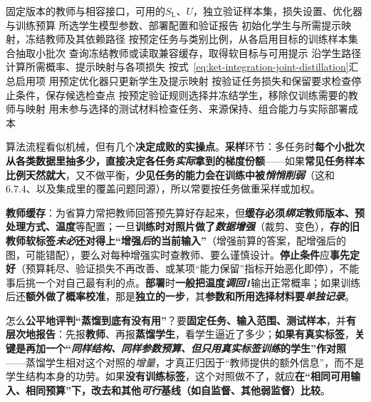 \begin{algorithm}[从冻结教师到可部署学生]
  \label{alg:ket-integration-distillation-loop}
  \begin{algorithmic}[1]
    \Require 固定版本的教师与相容接口，可用的$S_{\mathrm{L}}$、$U$，独立验证样本集，损失设置、优化器与训练预算
    \Ensure 所选学生模型参数、部署配置和验证报告
    \State 初始化学生与所需提示映射，冻结教师及其依赖路径
      \State 按预定任务与类别比例，从各启用目标的训练样本集合抽取小批次
      \State 查询冻结教师或读取兼容缓存，取得软目标与可用提示
      \State 沿学生路径计算所需概率、提示映射与各项损失
      \State 按式~\eqref{eq:ket-integration-joint-distillation}汇总启用项
      \State 用预定优化器只更新学生及提示映射
      \State 按验证任务损失和保留要求检查停止条件，保存候选检查点
    \EndFor
    \State 按预定验证规则选择并冻结学生，移除仅训练需要的教师与映射
    \State 用未参与选择的测试材料检查任务、来源保持、组合能力与实际部署成本
  \end{algorithmic}
\end{algorithm}

算法流程看似机械，但有几个\textbf{决定成败的实操点}。\textbf{采样}环节：多任务时\textbf{每个小批次从各类数据里抽多少，直接决定各任务\emph{实际}拿到的梯度份额}——如果\textbf{常见任务样本比例天然就大}，又不做平衡，\textbf{少见任务的能力会在训练中被\emph{悄悄削弱}}（这和6.7.4、以及集成里的覆盖问题同源），所以常要按任务做重采样或加权。

\textbf{教师缓存}：为省算力常把教师回答预先算好存起来，但\textbf{缓存必须\emph{绑定}教师版本、预处理方式、温度}等配置；一旦\textbf{训练时对照片做了\emph{数据增强}}（裁剪、变色），\textbf{存的旧教师软标签\emph{未必}还对得上“增强\emph{后}的当前输入”}（增强前算的答案，配增强后的图，可能错配），要么对每种增强实时查教师、要么谨慎设计。\textbf{停止条件}应\textbf{事先定好}（预算耗尽、验证损失不再改善、或某项“能力保留”指标开始恶化即停），不能事后挑一个对自己最有利的点。\textbf{部署}时\textbf{一般把温度\emph{调回1}}输出正常概率；如果训练后还\textbf{额外做了概率校准}，那是\textbf{独立的一步}，其\textbf{参数和所用选择材料要\emph{单独记录}}。

怎么\textbf{公平地评判“蒸馏到底有没有用”}？要\textbf{固定任务、输入范围、测试样本}，并\textbf{有层次地报告}：先报\textbf{教师}、再报\textbf{蒸馏学生}，看学生逼近了多少；\textbf{如果有真实标签}，\textbf{关键是再加一个“\emph{同样结构、同样参数预算、但\emph{只}用真实标签训练}的学生”作对照}——蒸馏学生相对这个对照的\emph{增量}，才真正归因于“教师提供的额外信息”，而不是学生结构本身的功劳。如果\textbf{没有训练标签}，这个对照做不了，就应\textbf{在“相同可用输入、相同预算”下，改去和其他\emph{可行}基线（如自监督、其他弱监督）比较}。

